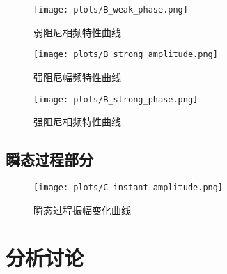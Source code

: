 \documentclass[UTF8]{ctexart}
\begin{document}
\begin{figure}[H]
\centering
\texttt{[image: plots/B\_weak\_phase.png]}
\caption{弱阻尼相频特性曲线}
\end{figure}

\begin{figure}[H]
\centering
\texttt{[image: plots/B\_strong\_amplitude.png]}
\caption{强阻尼幅频特性曲线}
\end{figure}

\begin{figure}[H]
\centering
\texttt{[image: plots/B\_strong\_phase.png]}
\caption{强阻尼相频特性曲线}
\end{figure}

\subsection{瞬态过程部分}
\begin{figure}[H]
\centering
\texttt{[image: plots/C\_instant\_amplitude.png]}
\caption{瞬态过程振幅变化曲线}
\end{figure}

\section{分析讨论}
\end{document}
